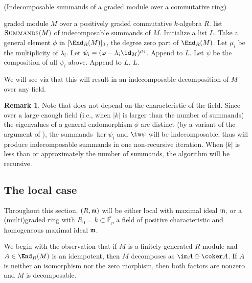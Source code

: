 \documentclass[12pt]{article}
\def\FF{\mathbb F}
\theoremstyle{theorem}
\numberwithin{thm}{section}
\theoremstyle{definition}
\newtheorem{rem}[thm]{Remark}
\begin{document}
\begin{algorithm}[H]
  \caption{(Indecomposable summands of a graded module over a commutative ring)}\label{alg:graded}
  \begin{algorithmic}[1]
    \smallskip
    \Require graded module $M$ over a positively graded commutative $k$-algebra $R$.
    \Ensure  list $\textproc{Summands}(M)$ of indecomposable summands of $M$.
    \State Initialize a list $L$.
    \State Take a general element $\phi$ in $[\End_R(M)]_0$,
           the degree zero part of $\End_R(M)$. \label{item:End0}
      \State Let $\mu_i$ be the multiplicity of $\lambda_i$.
      \State Let $\psi_i = (\phi - \lambda_i \id_M)^{\mu_i}$.
      \State Append  to $L$.
    \EndFor
    \State Let $\psi$ be the composition of all $\psi_i$ above.
      \State Append  to $L$.
    \EndIf
    \State \Return $L$.
  \end{algorithmic}
\end{algorithm}

We will see via  that this will result in an indecomposable decomposition of $M$ over any field.

\begin{rem}
Note that  does not depend on the characteristic of the field.
Since over a large enough field (i.e., when $|k|$ is larger than the number of summands) the eigenvalues of a general endomorphism $\phi$ are distinct (by a variant of the argument of ),
the summands $\ker\psi_i$ and $\im\psi$ will be indecomposable; thus  will produce indecomposable summands in one non-recursive iteration. 
When $|k|$ is less than or approximately the number of summands, the algorithm will be recursive.
\end{rem}

\subsection{The local case}\label{sec:local-alg}

Throughout this section, $(R,\mathfrak m)$ will be either local with maximal ideal $\mathfrak m$, or a (multi)graded ring with $R_0 = k \subset \overline{\FF_p}$ a field of positive characteristic and homogeneous maximal ideal $\mathfrak m$.

We begin with the observation that if $M$ is a finitely generated $R$-module and $A\in\End_R(M)$ is an idempotent, then $M$ decomposes as $\im A \oplus \coker A$. If $A$ is neither an isomorphism nor the zero morphism, then both factors are nonzero and $M$ is decomposable.
\end{document}
